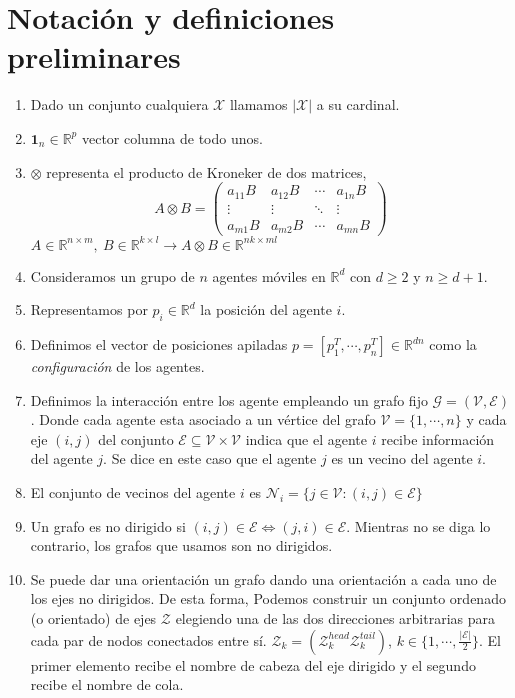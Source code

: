 \documentclass[10pt,a4paper]{article}
\begin{document}
\section{Notación y definiciones preliminares}
\begin{enumerate}
\item Dado un conjunto cualquiera $\mathcal{X}$ llamamos $\vert \mathcal{X} \vert$ a su cardinal.
\item $\mathbf{1}_n \in \mathbb{R}^p$ vector columna de todo unos. 
\item $\otimes$ representa el producto de Kroneker de dos matrices,
\begin{equation}
A\otimes B = \begin{pmatrix}
a_{11}B & a_{12}B &\cdots& a_{1n}B\\
\vdots  &\vdots &\ddots & \vdots\\
a_{m1}B &a_{m2}B &\cdots & a_{mn}B
\end{pmatrix}
\end{equation}
$A\in \mathbb{R}^{n\times m},\ B\in \mathbb{R}^{k\times l} \rightarrow A\otimes B \in \mathbb{R}^{nk\times ml}$
\item Consideramos un grupo de $n$ agentes móviles en $\mathbb{R}^d$ con $d\geq 2$ y $n \geq d+1$.          
\item Representamos por $p_i \in \mathbb{R}^d$ la posición del agente $i$.
\item Definimos el vector de posiciones apiladas $p =[p_1^T,\cdots,p_n^T] \in \mathbb{R}^{dn}$ como la \emph{configuración} de los agentes.
\item Definimos la interacción entre los agente empleando un grafo fijo $\mathcal{G} = (\mathcal{V},\mathcal{E})$. Donde cada agente esta asociado a un vértice del grafo $\mathcal{V}= \{1,\cdots,n\}$ y cada eje $(i,j)$ del conjunto $\mathcal{E} \subseteq \mathcal{V}\times \mathcal{V}$ indica que el agente $i$ recibe información del agente $j$. Se dice en este caso que el agente $j$ es un vecino del agente $i$.
\item El conjunto de vecinos del agente $i$ es $\mathcal{N}_i = \{j \in \mathcal{V}: (i,j) \in \mathcal{E}\}$
\item Un grafo es no dirigido si $(i,j)\in \mathcal{E} \Leftrightarrow (j,i) \in \mathcal{E}$. Mientras  no se diga lo contrario, los grafos que usamos son no dirigidos.
\item Se puede dar una orientación  un grafo dando una orientación a cada uno de los ejes no dirigidos. De esta forma, Podemos construir un conjunto ordenado (o orientado) de ejes $\mathcal{Z}$ elegiendo una de las dos direcciones arbitrarias para cada par de nodos conectados entre sí. $\mathcal{Z}_k=(\mathcal{Z}_k^{head} \mathcal{Z}_k^{tail})$, $k \in \{1,\cdots,\frac{\vert\mathcal{E}\vert}{2}\}$. El primer elemento recibe el nombre de cabeza del eje dirigido y el segundo recibe el nombre de cola.


\end{enumerate}
\end{document}
